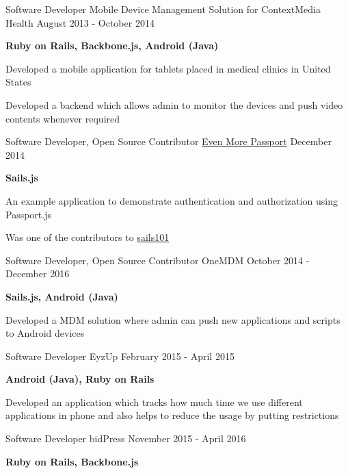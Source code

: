 \begin{cventries}
  \cventry
    {Software Developer}
    {Mobile Device Management Solution for ContextMedia Health}
    {}
    {August 2013 - October 2014}
    {
      \begin{cvitems}
        \item {\textbf{Ruby on Rails, Backbone.js, Android (Java)}}
        \item {Developed a mobile application for tablets placed in medical clinics in United States}
        \item {Developed a backend which allows admin to monitor the devices and push video contents whenever required}
      \end{cvitems}
    }
  \cventry
    {Software Developer, Open Source Contributor}
    {\href{https://github.com/sails101/even-more-passport/}{Even More Passport}}
    {}
    {December 2014}
    {
      \begin{cvitems}
        \item {\textbf{Sails.js}}
        \item {An example application to demonstrate authentication and authorization using Passport.js}
        \item {Was one of the contributors to \href{https://github.com/sails101}{sails101}}
      \end{cvitems}
    }
  \cventry
    {Software Developer, Open Source Contributor}
    {OneMDM}
    {}
    {October 2014 - December 2016}
    {
      \begin{cvitems}
        \item {\textbf{Sails.js, Android (Java)}}
        \item {Developed a MDM solution where admin can push new applications and scripts to Android devices}
      \end{cvitems} 
    }
  \cventry
    {Software Developer}
    {EyzUp}
    {}
    {February 2015 - April 2015}
    {
      \begin{cvitems}
        \item {\textbf{Android (Java), Ruby on Rails}}
        \item {Developed an application which tracks how much time we use different applications in phone and also helps to reduce the usage by putting restrictions}
      \end{cvitems}
    }
  \cventry
    {Software Developer}
    {bidPress}
    {}
    {November 2015 - April 2016}
    {
      \begin{cvitems}
        \item {\textbf{Ruby on Rails, Backbone.js}}

\end{cvitems}}
\end{cventries}
